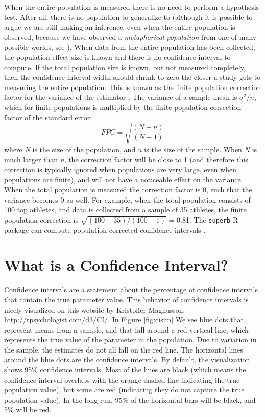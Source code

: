 \documentclass[
  oneside]{krantz}
\begin{document}
When the entire population is measured there is no need to perform a hypothesis test. After all, there is no population to generalize to (although it is possible to argue we are still making an inference, even when the entire population is observed, because we have observed a \emph{metaphorical population} from one of many possible worlds, see \citet{spiegelhalter_art_2019}). When data from the entire population has been collected, the population effect size is known and there is no confidence interval to compute. If the total population size is known, but not measured completely, then the confidence interval width should shrink to zero the closer a study gets to measuring the entire population. This is known as the finite population correction factor for the variance of the estimator \citep{kish_survey_1965}. The variance of a sample mean is \(\sigma^2/n\), which for finite populations is multiplied by the finite population correction factor of the standard error:
\[FPC = \sqrt{\frac{(N - n)}{(N-1)}}\]
where \emph{N} is the size of the population, and \emph{n} is the size of the sample. When \emph{N} is much larger than \emph{n}, the correction factor will be close to 1 (and therefore this correction is typically ignored when populations are very large, even when populations are finite), and will not have a noticeable effect on the variance. When the total population is measured the correction factor is 0, such that the variance becomes 0 as well. For example, when the total population consists of 100 top athletes, and data is collected from a sample of 35 athletes, the finite population correction is \(\sqrt{(100 - 35)/(100-1)}\) = 0.81. The \texttt{superb} R package can compute population corrected confidence intervals \citep{cousineau_superb_2019}.

\hypertarget{what-is-a-confidence-interval}{%
\section{What is a Confidence Interval?}\label{what-is-a-confidence-interval}}

Confidence intervals are a statement about the percentage of confidence intervals that contain the true parameter value. This behavior of confidence intervals is nicely visualized on this website by Kristoffer Magnusson: \url{http://rpsychologist.com/d3/CI/}. In Figure \ref{fig:cisim} We see blue dots that represent means from a sample, and that fall around a red vertical line, which represents the true value of the parameter in the population. Due to variation in the sample, the estimates do not all fall on the red line. The horizontal lines around the blue dots are the confidence intervals. By default, the visualization shows 95\% confidence intervals. Most of the lines are black (which means the confidence interval overlaps with the orange dashed line indicating the true population value), but some are red (indicating they do not capture the true population value). In the long run, 95\% of the horizontal bars will be black, and 5\% will be red.
\end{document}
